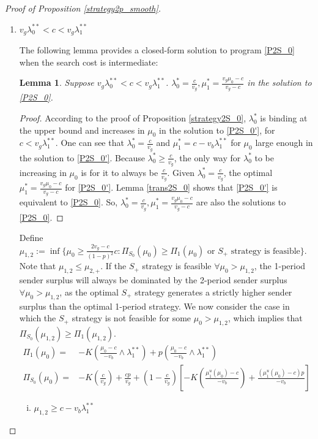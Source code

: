 \documentclass[11pt]{extarticle}
\newtheorem{lemma}{Lemma}
\newcommand{\m}{\wedge}
\begin{document}
\begin{proof}[Proof of Proposition \ref{strategy2p_smooth}]
\begin{enumerate}
\begin{enumerate}
			\item $v_g \lambda_0^{**} < c < v_g \lambda_1^{**}$
			
			The following lemma provides a closed-form solution to program \eqref{P2S_0} when the search cost is intermediate:
			\begin{lemma}\label{bindingi}
				Suppose $v_g\lambda_0^{**}<c<v_g\lambda_1^{**}$. $\lambda_0^* = \frac{c}{v_g}, \mu_1^* = \frac{v_g\mu_0-c}{v_g-c}$ in the solution to \eqref{P2S_0}.
			\end{lemma}
			\begin{proof}
				According to the proof of Proposition \ref{strategy2S_0}, $\lambda_0^*$ is binding at the upper bound and increases in $\mu_0$ in the solution to \eqref{P2S_0'}, for $c < v_g\lambda_1^{**}$. One can see that $\lambda_0^* = \frac{c}{v_g}$ and $\mu_1^* = c - v_b \lambda_{1}^{**}$ for $\mu_0$ large enough in the solution to \eqref{P2S_0'}. Because $\lambda_0^* \geq \frac{c}{v_g}$, the only way for $\lambda_0^*$ to be increasing in $\mu_0$ is for it to always be $\frac{c}{v_g}$. Given $\lambda_0^* = \frac{c}{v_g}$, the optimal $\mu_1^* = \frac{v_g\mu_0-c}{v_g-c}$ for \eqref{P2S_0'}.  Lemma \ref{trans2S_0} shows that \eqref{P2S_0'} is equivalent to \eqref{P2S_0}. So, $\lambda_0^* = \frac{c}{v_g}, \mu_1^* = \frac{v_g\mu_0-c}{v_g-c}$ are also the solutions to \eqref{P2S_0}.
			\end{proof}
			
			Define $\mu_{1,2}:=\inf\{\mu_0\geq\frac{2v_g-c}{(1-p)^2}c:\Pi_{S_0}(\mu_0)\geq\Pi_1(\mu_0) \text{ or }S_+ \text{ strategy is feasible}\}$. Note that $\mu_{1,2} \leq \mu_{2,+}$. If the $S_+$ strategy is feasible $\forall \mu_0 > \mu_{1,2}$, the 1-period sender surplus will always be dominated by the 2-period sender surplus $\forall \mu_0 > \mu_{1,2}$, as the optimal $S_+$ strategy generates a strictly higher sender surplus than the optimal 1-period strategy. We now consider the case in which the $S_+$ strategy is not feasible for some $\mu_0 > \mu_{1,2}$, which implies that $\Pi_{S_0}(\mu_{1,2}) \geq \Pi_1(\mu_{1,2})$.
			\begin{align*}
			\Pi_1(\mu_0) =& -K(\frac{\mu_0-c}{-v_b}\m\lambda_1^{**})+p(\frac{\mu_0-c}{-v_b}\m\lambda_1^{**})\\
			\Pi_{S_0}(\mu_0) =&-K(\frac{c}{v_g})+\frac{cp}{v_g}+(1-\frac{c}{v_g})\left[-K(\frac{\mu_1^u(\mu_0)-c}{-v_b})+\frac{(\mu_1^u(\mu_0)-c)p}{-v_b}\right]
			\end{align*}
			\begin{enumerate}[i)]
				\item $\mu_{1,2} \geq c - v_b\lambda_1^{**}$
				

\end{enumerate}
\end{enumerate}
\end{enumerate}
\end{proof}
\end{document}

